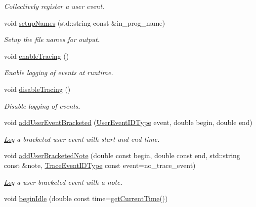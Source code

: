 \begin{DoxyCompactItemize}
\begin{DoxyCompactList}\small\item\em Collectively register a user event. \end{DoxyCompactList}\item 
void \hyperlink{structvt_1_1trace_1_1_trace_lite_a1f8e52289799bcd6b469b20be7d1e149}{setup\+Names} (std\+::string const \&in\+\_\+prog\+\_\+name)
\begin{DoxyCompactList}\small\item\em Setup the file names for output. \end{DoxyCompactList}\item 
void \hyperlink{structvt_1_1trace_1_1_trace_lite_a99c538b6e3cd2521bba5cba161ac4240}{enable\+Tracing} ()
\begin{DoxyCompactList}\small\item\em Enable logging of events at runtime. \end{DoxyCompactList}\item 
void \hyperlink{structvt_1_1trace_1_1_trace_lite_ac494fd6858647fd548b6554cf066568b}{disable\+Tracing} ()
\begin{DoxyCompactList}\small\item\em Disable logging of events. \end{DoxyCompactList}\item 
void \hyperlink{structvt_1_1trace_1_1_trace_lite_ac683bae25af871b4e7b0deaf73bde529}{add\+User\+Event\+Bracketed} (\hyperlink{namespacevt_1_1trace_a5908920d051c144c89f17c69ed262350}{User\+Event\+I\+D\+Type} event, double begin, double end)
\begin{DoxyCompactList}\small\item\em \hyperlink{structvt_1_1trace_1_1_log}{Log} a bracketed user event with start and end time. \end{DoxyCompactList}\item 
void \hyperlink{structvt_1_1trace_1_1_trace_lite_aac43836481f9848a210f935837167bc5}{add\+User\+Bracketed\+Note} (double const begin, double const end, std\+::string const \&note, \hyperlink{namespacevt_1_1trace_a64a7185f3e102df8d8258f263ccd1582}{Trace\+Event\+I\+D\+Type} const event=no\+\_\+trace\+\_\+event)
\begin{DoxyCompactList}\small\item\em \hyperlink{structvt_1_1trace_1_1_log}{Log} a user bracketed event with a note. \end{DoxyCompactList}\item 
void \hyperlink{structvt_1_1trace_1_1_trace_lite_a48ffd3b44801a6d79681086e2c031983}{begin\+Idle} (double const time=\hyperlink{structvt_1_1trace_1_1_trace_lite_ad1d8159d645a3b7047ce3f2e0c080f8d}{get\+Current\+Time}())

\end{DoxyCompactItemize}
